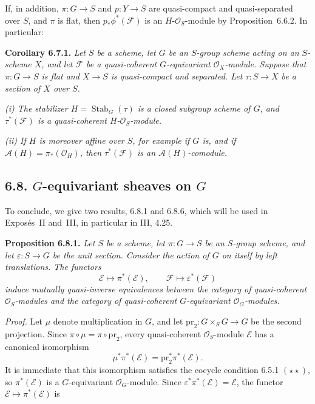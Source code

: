 If, in addition, \(\pi:G\to S\) and \(p:Y\to S\) are quasi-compact
and quasi-separated over \(S\), and \(\pi\) is flat, then
\(p_*\phi^*(\mathcal F)\) is an \(H\)-\(\mathcal O_S\)-module by
Proposition~6.6.2. In particular:

\medskip
\noindent\textbf{Corollary 6.7.1.}
\textit{Let \(S\) be a scheme, let \(G\) be an \(S\)-group scheme
acting on an \(S\)-scheme \(X\), and let \(\mathcal F\) be a
quasi-coherent \(G\)-equivariant \(\mathcal O_X\)-module. Suppose that
\(\pi:G\to S\) is flat and \(X\to S\) is quasi-compact and separated.
Let \(\tau:S\to X\) be a section of \(X\) over \(S\).}

\textit{(i) The stabilizer \(H=\operatorname{Stab}_G(\tau)\) is a
closed subgroup scheme of \(G\), and \(\tau^*(\mathcal F)\) is a
quasi-coherent \(H\)-\(\mathcal O_S\)-module.}

\textit{(ii) If \(H\) is moreover affine over \(S\), for example if
\(G\) is, and if \(\mathscr A(H)=\pi_*(\mathcal O_H)\), then
\(\tau^*(\mathcal F)\) is an \(\mathscr A(H)\)-comodule.}

\subsection*{6.8. \(G\)-equivariant sheaves on \(G\)}

To conclude, we give two results, 6.8.1 and 6.8.6, which will be used
in Expos\'es~II and~III, in particular in III, 4.25.

\medskip
\noindent\textbf{Proposition 6.8.1.}
\textit{Let \(S\) be a scheme, let \(\pi:G\to S\) be an \(S\)-group
scheme, and let \(\varepsilon:S\to G\) be the unit section. Consider
the action of \(G\) on itself by left translations. The functors}
\[
  \mathcal E\longmapsto\pi^*(\mathcal E),
  \qquad
  \mathcal F\longmapsto\varepsilon^*(\mathcal F)
\]
\textit{induce mutually quasi-inverse equivalences between the category
of quasi-coherent \(\mathcal O_S\)-modules and the category of
quasi-coherent \(G\)-equivariant \(\mathcal O_G\)-modules.}

\textit{Proof.}
Let \(\mu\) denote multiplication in \(G\), and let
\(\mathrm{pr}_2:G\times_SG\to G\) be the second projection. Since
\(\pi\circ\mu=\pi\circ\mathrm{pr}_2\), every quasi-coherent
\(\mathcal O_S\)-module \(\mathcal E\) has a canonical isomorphism
\[
  \mu^*\pi^*(\mathcal E)
  =\mathrm{pr}_2^*\pi^*(\mathcal E).
\]
It is immediate that this isomorphism satisfies the cocycle condition
6.5.1 \((\star\star)\), so \(\pi^*(\mathcal E)\) is a
\(G\)-equivariant \(\mathcal O_G\)-module. Since
\(\varepsilon^*\pi^*(\mathcal E)=\mathcal E\), the functor
\(\mathcal E\mapsto\pi^*(\mathcal E)\) is

